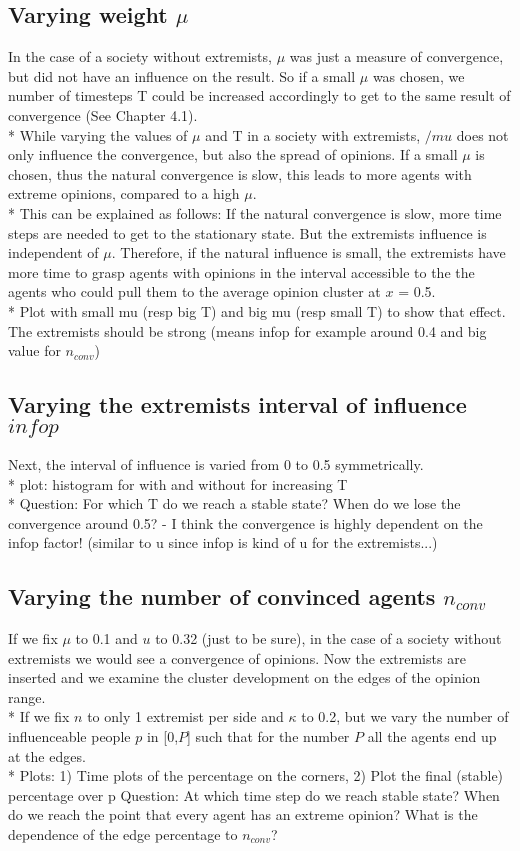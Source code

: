 \documentclass[11pt]{article}
\begin{document}
\subsection{Varying weight \texorpdfstring{$\mu$}{TEXT}}
In the case of a society without extremists, $\mu$ was just a measure of convergence, but did not have an influence on the result. So if a small $\mu$ was chosen, we number of timesteps T could be increased accordingly to get  to the same result of convergence (See Chapter 4.1). \\*
While varying the values of $\mu$ and T in a society with extremists, $/mu$ does not only influence the convergence, but also the spread of opinions. If a small $\mu$ is chosen, thus the natural convergence is slow, this leads to more agents with extreme opinions, compared to a high $\mu$. \\*
This can be explained as follows: If the natural convergence is slow, more time steps are needed to get to the stationary state. But the extremists influence is independent of $\mu$. Therefore, if the natural influence is small, the extremists have more time to grasp agents with opinions in the interval accessible to the the agents who could pull them to the average opinion cluster at $x$ = 0.5. \\*
Plot with small mu (resp big T) and big mu (resp small T) to show that effect. The extremists should be strong (means infop for example around 0.4 and big value for $n_{conv}$)

\subsection{Varying the extremists interval of influence \texorpdfstring{$infop$}{TEXT}}
Next, the interval of influence is varied from 0 to 0.5 symmetrically. \\*
plot: histogram for with and without for increasing T \\*
Question: For which T do we reach a stable state? When do we lose the convergence around 0.5? - I think the convergence is highly dependent on the infop factor! (similar to u since infop is kind of u for the extremists...)

\subsection{Varying the number of convinced agents \texorpdfstring{$n_{conv}$}{TEXT}}
If we fix $\mu$ to 0.1 and $u$ to 0.32 (just to be sure), in the case of a society without extremists we would see a convergence of opinions. Now the extremists are inserted and we examine the cluster development on the edges of the opinion range. \\*
If we fix $n$ to only 1 extremist per side and $\kappa$ to 0.2, but we vary the number of influenceable people $p$ in [0,$P$] such that for the number $P$ all the agents end up at the edges. \\*
Plots: 1) Time plots of the percentage on the corners, 2) Plot the final (stable) percentage over p
Question: At which time step do we reach stable state? When do we reach the point that every agent has an extreme opinion? What is the dependence of the edge percentage to $n_{conv}$?
\end{document}
